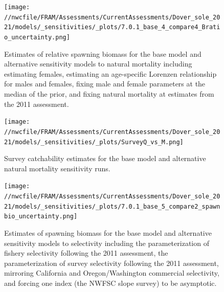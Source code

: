 \documentclass[11pt,
  english,
  a4paper,
]{article}
\begin{document}
\begin{figure}
\centering
\texttt{[image: //nwcfile/FRAM/Assessments/CurrentAssessments/Dover\_sole\_2021/models/\_sensitivities/\_plots/7.0.1\_base\_4\_compare4\_Bratio\_uncertainty.png]}
\caption{Estimates of relative spawning biomass for the base model and alternative sensitivity models to natural mortality including estimating females, estimating an age-specific Lorenzen relationship for males and females, fixing male and female parameters at the median of the prior, and fixing natural mortality at estimates from the 2011 assessment.\label{fig:sens-m-relssb}}
\end{figure}

\tagmcend\tagstructend


\begin{figure}
\centering
\texttt{[image: //nwcfile/FRAM/Assessments/CurrentAssessments/Dover\_sole\_2021/models/\_sensitivities/\_plots/SurveyQ\_vs\_M.png]}
\caption{Survey catchability estimates for the base model and alternative natural mortality sensitivity runs.\label{fig:sens-m-survQ}}
\end{figure}

\tagmcend\tagstructend


\begin{figure}
\centering
\texttt{[image: //nwcfile/FRAM/Assessments/CurrentAssessments/Dover\_sole\_2021/models/\_sensitivities/\_plots/7.0.1\_base\_5\_compare2\_spawnbio\_uncertainty.png]}
\caption{Estimates of spawning biomass for the base model and alternative sensitivity models to selectivity including the parameterization of fishery selectivity following the 2011 assessment, the parameterization of survey selectivity following the 2011 assessment, mirroring California and Oregon/Washington commercial selectivity, and forcing one index (the NWFSC slope survey) to be asymptotic.\label{fig:sens-select-ssb}}
\end{figure}
\end{document}
